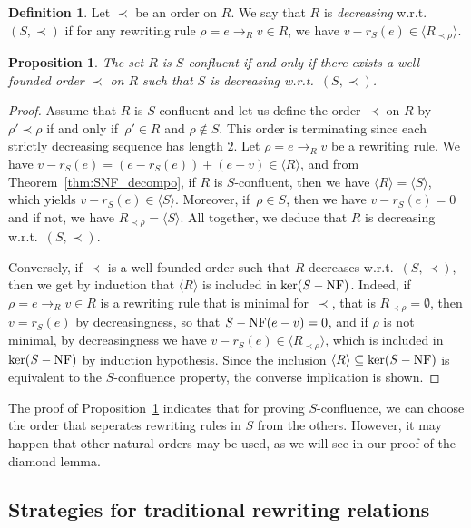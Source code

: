 \documentclass[11pt]{article}
\newtheorem{proposition}[theorem]{Proposition}
\theoremstyle{definition}
\newtheorem{definition}[theorem]{Definition}
\newcommand\wrt{w.r.t.}
\newcommand\Rrho{R_{\prec\rho}}
\newcommand\Span[1]{\langle #1\rangle}
\newcommand\rewR{\to_R}
\DeclareMathOperator{\SNF}{{\it S}-NF}
\begin{document}
\begin{definition}
  Let $\prec$ be an order on $R$. We say that $R$ is {\em decreasing}
  \wrt\ $(S,\prec)$ if for any rewriting rule $\rho=e\rewR v \in R$, we 
  have $v-r_S(e)\in\Span{\Rrho}$.
\end{definition}
\smallskip

\begin{proposition}\label{prop:decreasing}
  The set $R$ is $S$-confluent if and only if there exists a well-founded
  order $\prec$ on $R$ such that $S$ is decreasing \wrt\ $(S,\prec)$.
\end{proposition}

\begin{proof}
  Assume that $R$ is $S$-confluent and let us define the order $\prec$ on
  $R$ by $\rho'\prec\rho$ if and only if~$\rho'\in R$ and $\rho\notin S$.
  This order is terminating since each strictly decreasing sequence has
  length $2$. Let $\rho=e\rewR v$ be a rewriting rule. We have
  $v-r_S(e)=(e-r_S(e))+(e-v)\in\Span{R}$, and from
  Theorem~\ref{thm:SNF_decompo}, if $R$ is $S$-confluent, then we have
  $\Span{R}=\Span{S}$, which yields $v-r_S(e)\in\Span{S}$. Moreover, 
  if~$\rho\in S$, then we have $v-r_S(e)=0$ and if not, we have
  $\Rrho=\Span{S}$. All together, we deduce that $R$ is decreasing \wrt\
  $(S,\prec)$.
  \smallskip
  
  Conversely, if $\prec$ is a well-founded order such that $R$ decreases
  \wrt\ $(S,\prec)$, then we get by induction that $\Span{R}$ is included
  in $\ker(\SNF)$. Indeed, if $\rho=e\rewR v\in R$ is a rewriting rule
  that is minimal for~$\prec$, that is $\Rrho=\emptyset$, then $v=r_S(e)$
  by decreasingness, so that $\SNF(e-v)=0$, and if $\rho$ is not minimal,
  by decreasingness we have $v-r_S(e)\in\Span{\Rrho}$, which is included
  in $\ker(\SNF)$ by induction hypothesis. Since the inclusion
  $\Span{R}\subseteq\ker(\SNF)$ is equivalent to the $S$-confluence
  property, the converse implication is shown.
\end{proof}
\smallskip

The proof of Proposition~\ref{prop:decreasing} indicates that for proving
$S$-confluence, we can choose the order that seperates rewriting rules in
$S$ from the others. However, it may happen that other natural orders may
be used, as we will see in our proof of the diamond lemma.

\subsection{Strategies for traditional rewriting relations}
\label{sec:strategies_for_traditional_rewriting_relations}
\end{document}
